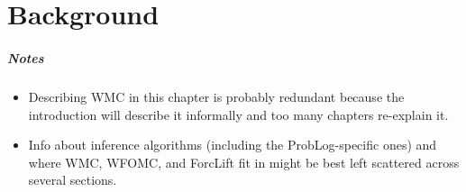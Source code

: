 \chapter{Background}

\paragraph{Notes}
\begin{itemize}
\item Describing WMC in this chapter is probably redundant because the introduction will describe it informally and too many chapters re-explain it.
\item Info about inference algorithms (including the ProbLog-specific ones) and where WMC, WFOMC, and ForcLift fit in might be best left scattered across several sections.
\end{itemize}

